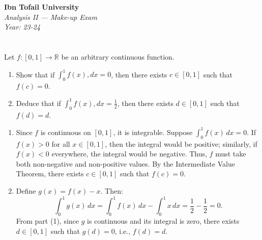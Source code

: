 \documentclass[12pt]{article}
\begin{document}
\begin{center}
  \Large\textbf{Ibn Tofail University} \\[1em]
  \large\textit{Analysis II — Make-up Exam} \\[0.5em]
  \large\textit{Year: 23-24} \\[2em]
\end{center}

\vspace{0.5cm}

\section{}
Let $f: [0, 1] \rightarrow \mathbb{R}$ be an arbitrary continuous function.
\begin{enumerate}
\item Show that if $\int_{0}^{1} f(x) , dx = 0$, then there exists $c \in [0, 1]$ such that $f(c) = 0$.
\item Deduce that if $\int_{0}^{1} f(x) , dx = \frac{1}{2}$, then there exists $d \in [0, 1]$ such that $f(d) = d$.
\end{enumerate}

\newpage

\begin{answerbox}
  \begin{enumerate}
    \item Since $ f $ is continuous on $[0,1]$, it is integrable. Suppose $ \int_0^1 f(x)\,dx = 0 $. If $ f(x) > 0 $ for all $ x \in [0,1] $, then the integral would be positive; similarly, if $ f(x) < 0 $ everywhere, the integral would be negative. Thus, $ f $ must take both non-negative and non-positive values. By the Intermediate Value Theorem, there exists $ c \in [0,1] $ such that $ f(c) = 0 $.

    \item Define $ g(x) = f(x) - x $. Then:
    $$
    \int_0^1 g(x)\,dx = \int_0^1 f(x)\,dx - \int_0^1 x\,dx = \frac{1}{2} - \frac{1}{2} = 0.
    $$
    From part (1), since $ g $ is continuous and its integral is zero, there exists $ d \in [0,1] $ such that $ g(d) = 0 $, i.e., $ f(d) = d $.
\end{enumerate}
\end{answerbox}

\newpage

\end{document}
